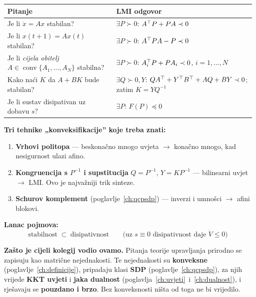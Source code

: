 \begin{center}
\begin{tabular}{P{4.4cm}P{8.6cm}}
\toprule
\textbf{Pitanje} & \textbf{LMI odgovor} \\
\midrule
Je li $\dot x = Ax$ stabilan?
  & $\exists P \succ 0$: $A^{\top} P + PA \prec 0$ \\
Je li $x(t{+}1) = Ax(t)$ stabilan?
  & $\exists P \succ 0$: $A^{\top} PA - P \prec 0$ \\
Je li \emph{cijela obitelj} $A \in \operatorname{conv}\{A_1,\dots,A_N\}$
  stabilna?
  & $\exists P \succ 0$: $A_i^{\top} P + PA_i \prec 0$, $i = 1,\dots,N$ \\
Kako naći $K$ da $A+BK$ bude stabilan?
  & $\exists Q \succ 0, Y$: $QA^{\top} + Y^{\top} B^{\top} + AQ + BY \prec 0$;\newline
    zatim $K = YQ^{-1}$ \\
Je li sustav disipativan uz dobavu $s$?
  & $\exists P$: $F(P) \preceq 0$ \\
\bottomrule
\end{tabular}
\end{center}

\textbf{Tri tehnike „konveksifikacije” koje treba znati:}

\begin{enumerate}
  \item \textbf{Vrhovi politopa} --- beskonačno mnogo uvjeta $\to$ konačno
        mnogo, kad nesigurnost ulazi afino.
  \item \textbf{Kongruencija s $P^{-1}$ i supstitucija} $Q = P^{-1}$,
        $Y = KP^{-1}$ --- bilinearni uvjet $\to$ LMI. Ovo je najvažniji trik
        sinteze.
  \item \textbf{Schurov komplement} (poglavlje~\ref{ch:qcpsdp}) --- inverzi i
        umnošci $\to$ afini blokovi.
\end{enumerate}

\textbf{Lanac pojmova:}
\[
\text{stabilnost} \;\subset\; \text{disipativnost}
\qquad\text{(uz } s \equiv 0 \text{ disipativnost daje } \dot V \le 0)
\]

\textbf{Zašto je cijeli kolegij vodio ovamo.} Pitanja teorije upravljanja
prirodno se zapisuju kao matrične nejednakosti. Te nejednakosti su
\textbf{konveksne} (poglavlje~\ref{ch:definicije}), pripadaju klasi
\textbf{SDP} (poglavlje~\ref{ch:qcpsdp}), za njih vrijede \textbf{KKT uvjeti} i
\textbf{jaka dualnost} (poglavlja~\ref{ch:uvjeti}~i~\ref{ch:dualnost}), i
rješavaju se \textbf{pouzdano i brzo}. Bez konveksnosti ništa od toga ne bi
vrijedilo.

